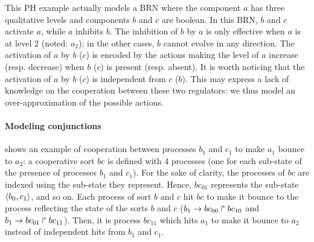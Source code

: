 \begin{example}
This PH example actually models a BRN where the component $a$ has three qualitative
levels and components $b$ and $c$ are boolean.
In this BRN, $b$ and $c$ activate $a$, while $a$ inhibits $b$.
The inhibition of $b$ by $a$ is only effective when $a$ is at level $2$ (noted: $a_2$);
in the other cases, $b$ cannot evolve in any direction.
The activation of $a$ by $b$ ($c$) is encoded by the actions making the level of $a$ increase (resp.
decrease) when $b$ ($c$) is present (resp. absent).
It is worth noticing that the activation of $a$ by $b$ ($c$) is independent from $c$ ($b$).
This may express a lack of knowledge on the cooperation between these two regulators:
we thus model an over-approximation of the possible actions.
\end{example}

\paragraph{Modeling conjunctions}
 shows an example of cooperation between processes $b_1$ and $c_1$ to
make $a_1$ bounce to $a_2$:
a cooperative sort $bc$ is defined with 4 processes (one for each sub-state of the presence of
processes $b_1$ and $c_1$).
For the sake of clarity, the processes of $bc$ are indexed using the sub-state they represent.
Hence, $bc_{01}$ represents the sub-state $\langle b_0,c_1 \rangle$, and so on.
Each process of sort $b$ and $c$ hit $bc$ to make it bounce to the process reflecting the state of the sorts $b$
and $c$ (\eg $b_1\rightarrow bc_{00}\Rsh bc_{10}$ and $b_1\rightarrow bc_{01}\Rsh bc_{11}$).
Then, it is process $bc_{11}$ which hits $a_1$ to make it bounce to $a_2$ instead of
independent hits from $b_1$ and $c_1$.

